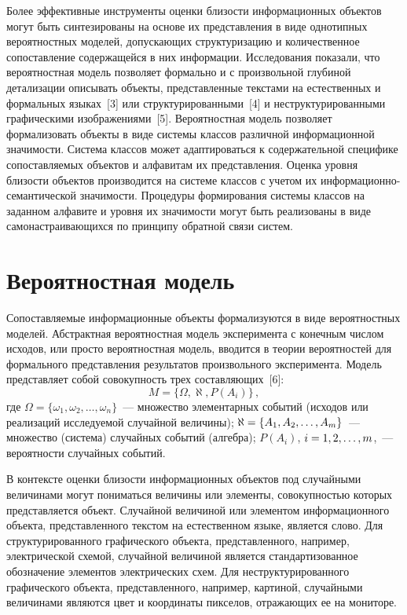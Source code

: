 \begin{multicols}{2}
  Более эффективные инструменты оценки близости информационных
объектов могут быть синтезированы на основе их представления в виде
однотипных вероятностных моделей, допускающих структуризацию и
количественное сопоставление содержащейся в них информации. Исследования
показали, что вероятностная модель позволяет формально и с произвольной
глубиной детализации описывать объекты, представленные текстами на
естественных и формальных языках~[3] или структурированными~[4] и
неструктурированными графическими изображениями~[5]. Вероятностная
модель позволяет формализовать объекты в виде системы классов различной
информационной значимости. Система классов может адаптироваться к
содержательной специфике сопоставляемых объектов и алфавитам их
представления. Оценка уровня близости объектов производится на системе
классов с учетом их ин\-фор\-ма\-ци\-он\-но-се\-ман\-ти\-че\-ской значимости.
Процедуры формирования системы классов на заданном алфавите и уровня их
значимости могут быть реализованы в виде самонастраивающихся по принципу
обратной связи систем.

\section{Вероятностная модель}

  Сопоставляемые информационные объекты формализуются в виде
вероятностных моделей. Абстрактная вероятностная модель эксперимента с
конечным числом исходов, или просто вероятностная модель, вводится в
теории вероятностей для формального представления результатов
произвольного эксперимента. Модель представляет собой совокупность
трех составляющих~[6]:
  \begin{equation}
  M=\{ \Omega, \aleph, P(A_i)\}\,,
  \label{e1-kuz}
  \end{equation}
  где $\Omega = \{\omega_1, \omega_2, \ldots , \omega_n\}$~--- множество
элементарных событий (исходов или реализаций исследу\-емой случайной
величины);
  $\aleph\hm= \{A_1, A_2, \ldots , A_m\}$~--- множество (система) случайных
событий (алгебра);
  $P(A_i)$, $i \hm= 1, 2, \ldots , m$,~--- вероятности случайных событий.

  В контексте оценки близости информационных объектов под случайными
величинами могут пониматься величины или элементы, совокупностью
которых представляется объект. Случайной величиной или элементом
информационного объекта, представленного текстом на естественном языке,\linebreak
является слово. Для структурированного графи\-ческого объекта,
представленного, например, электри\-ческой схемой, случайной величиной
является стандартизованное обозначение элементов электрических схем. Для
неструктурированного графического объекта, представленного, например,
картиной, случайными величинами являются цвет и координаты пикселов,
отражающих ее на мони\-торе.


\end{multicols}
